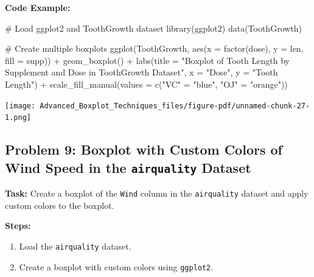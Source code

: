 \documentclass[
  letterpaper,
  DIV=11,
  numbers=noendperiod]{scrreprt}
\newenvironment{Shaded}{\begin{snugshade}}{\end{snugshade}}
\newcommand{\AttributeTok}[1]{\textcolor[rgb]{0.40,0.45,0.13}{#1}}
\newcommand{\CommentTok}[1]{\textcolor[rgb]{0.37,0.37,0.37}{#1}}
\newcommand{\FunctionTok}[1]{\textcolor[rgb]{0.28,0.35,0.67}{#1}}
\newcommand{\NormalTok}[1]{\textcolor[rgb]{0.00,0.23,0.31}{#1}}
\newcommand{\OtherTok}[1]{\textcolor[rgb]{0.00,0.23,0.31}{#1}}
\newcommand{\SpecialCharTok}[1]{\textcolor[rgb]{0.37,0.37,0.37}{#1}}
\newcommand{\StringTok}[1]{\textcolor[rgb]{0.13,0.47,0.30}{#1}}
\providecommand{\tightlist}{%
  \setlength{\itemsep}{0pt}\setlength{\parskip}{0pt}}\usepackage{longtable,booktabs,array}
\begin{document}
\textbf{Code Example:}

\begin{Shaded}
\begin{Highlighting}[]
\CommentTok{\# Load ggplot2 and ToothGrowth dataset}
\FunctionTok{library}\NormalTok{(ggplot2)}
\FunctionTok{data}\NormalTok{(ToothGrowth)}

\CommentTok{\# Create multiple boxplots}
\FunctionTok{ggplot}\NormalTok{(ToothGrowth, }\FunctionTok{aes}\NormalTok{(}\AttributeTok{x =} \FunctionTok{factor}\NormalTok{(dose), }\AttributeTok{y =}\NormalTok{ len, }\AttributeTok{fill =}\NormalTok{ supp)) }\SpecialCharTok{+}
  \FunctionTok{geom\_boxplot}\NormalTok{() }\SpecialCharTok{+}
  \FunctionTok{labs}\NormalTok{(}\AttributeTok{title =} \StringTok{"Boxplot of Tooth Length by Supplement and Dose in ToothGrowth Dataset"}\NormalTok{, }\AttributeTok{x =} \StringTok{"Dose"}\NormalTok{, }\AttributeTok{y =} \StringTok{"Tooth Length"}\NormalTok{) }\SpecialCharTok{+}
  \FunctionTok{scale\_fill\_manual}\NormalTok{(}\AttributeTok{values =} \FunctionTok{c}\NormalTok{(}\StringTok{"VC"} \OtherTok{=} \StringTok{"blue"}\NormalTok{, }\StringTok{"OJ"} \OtherTok{=} \StringTok{"orange"}\NormalTok{))}
\end{Highlighting}
\end{Shaded}

\texttt{[image: Advanced\_Boxplot\_Techniques\_files/figure-pdf/unnamed-chunk-27-1.png]}

\subsection*{\texorpdfstring{Problem 9: Boxplot with Custom Colors of
Wind Speed in the \texttt{airquality}
Dataset}{Problem 9: Boxplot with Custom Colors of Wind Speed in the airquality Dataset}}\label{problem-9-boxplot-with-custom-colors-of-wind-speed-in-the-airquality-dataset}

\textbf{Task:} Create a boxplot of the \texttt{Wind} column in the
\texttt{airquality} dataset and apply custom colors to the boxplot.

\textbf{Steps:}

\begin{enumerate}
\def\labelenumi{\arabic{enumi}.}
\tightlist
\item
  Load the \texttt{airquality} dataset.
\item
  Create a boxplot with custom colors using \texttt{ggplot2}.
\end{enumerate}
\end{document}
